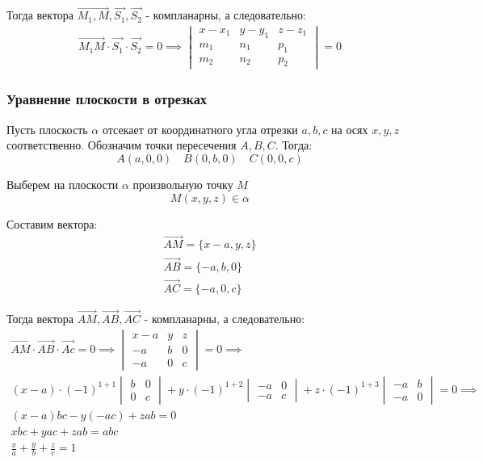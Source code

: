 Тогда вектора $\overrightarrow{M_1, M}, \vec{S_1}, \vec{S_2}$ - компланарны, а следовательно:
\begin{gather*}
  \overrightarrow{M_1 M} \cdot \vec{S_1} \cdot \vec{S_2} = 0
  \implies \boxed{
  \begin{vmatrix}
    x - x_1 & y - y_1 & z - z_1 \\
    m_1 & n_1 & p_1 \\
    m_2 & n_2 & p_2
  \end{vmatrix} = 0}
\end{gather*}

\subsubsection{Уравнение плоскости в отрезках}

Пусть плоскость $\alpha$ отсекает от координатного угла отрезки $a, b, c$ на осях  $x, y, z$ соответственно. Обозначим точки пересечения  $A, B, C$. Тогда: \[
  A(a, 0, 0) \quad B(0, b, 0) \quad C(0, 0, c)
\] 

Выберем на плоскости $\alpha$ произвольную точку $M$  \[
M(x, y, z) \in \alpha
\] 

Составим вектора:
\begin{gather*}
  \overrightarrow{AM} = \{x - a, y, z\} \\
  \overrightarrow{AB} = \{-a, b, 0\} \\
  \overrightarrow{AC} = \{-a , 0, c\} 
\end{gather*}

Тогда вектора $\overrightarrow{AM}, \overrightarrow{AB}, \overrightarrow{AC}$ - компланарны, а следовательно:
\begin{gather*}
  \overrightarrow{AM} \cdot \overrightarrow{AB} \cdot \overrightarrow{Ac} = 0
  \implies
  \begin{vmatrix}
    x - a & y & z \\
    -a & b & 0 \\
    -a & 0 & c
  \end{vmatrix} = 0 \implies \\
  (x - a) \cdot (-1)^{1+1} 
  \begin{vmatrix}
    b & 0 \\
    0 & c
  \end{vmatrix}
  + y \cdot (-1)^{1+2}
  \begin{vmatrix}
    -a & 0 \\
    -a & c
  \end{vmatrix}
  + z \cdot (-1)^{1+3}
  \begin{vmatrix}
    -a & b \\
    -a & 0
  \end{vmatrix} = 0 \implies \\
  (x - a) bc - y(-ac) + zab = 0 \\
  xbc + yac + zab = abc \\
  \boxed{\frac{x}{a} + \frac{y}{b} + \frac{z}{c} = 1}
\end{gather*}


